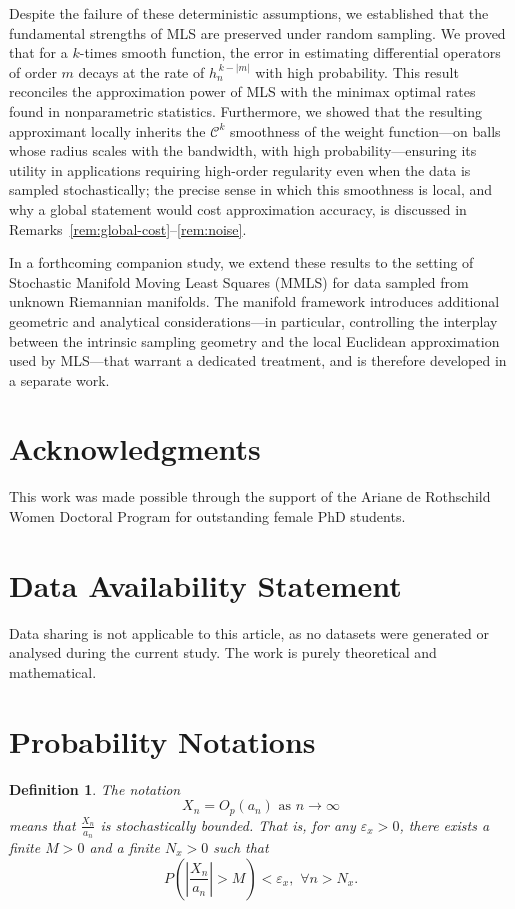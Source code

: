 \documentclass{article}
\newtheorem{definition}
{Definition}
\begin{document}
Despite the failure of these deterministic assumptions, we established that the
fundamental strengths of MLS are preserved under random sampling. We proved that
for a $k$-times smooth function, the error in estimating differential operators of
order $m$ decays at the rate of $h_n^{\,k-|m|}$ with
high probability. This result reconciles the approximation power of MLS with the
minimax optimal rates found in nonparametric statistics. Furthermore, we showed
that the resulting approximant locally inherits the $\mathcal{C}^k$ smoothness of the weight
function---on balls whose radius scales with the bandwidth, with high
probability---ensuring its utility in applications requiring high-order regularity
even when the data is sampled stochastically; the precise sense in which this
smoothness is local, and why a global statement would cost approximation accuracy,
is discussed in Remarks~\ref{rem:global-cost}--\ref{rem:noise}.

In a forthcoming companion study, we extend these results to the setting of
Stochastic Manifold Moving Least Squares (MMLS) for data sampled from unknown
Riemannian manifolds. The manifold framework introduces additional geometric and
analytical considerations---in particular, controlling the interplay between the
intrinsic sampling geometry and the local Euclidean approximation used by
MLS---that warrant a dedicated treatment, and is therefore developed in a separate
work.
\section*{Acknowledgments}

This work was made possible through the support of the Ariane de Rothschild Women Doctoral Program for outstanding female PhD students.

\section*{Data Availability Statement}
Data sharing is not applicable to this article, as no datasets were generated
or analysed during the current study. The work is purely theoretical and mathematical.

\appendix
\renewcommand{\thesection}{Appendix \Alph{section}:}
\section{Probability Notations}
\begin{definition}
    The notation 
    \begin{equation*}
        X_n=O_p\left(a_n\right) \text { as } n \rightarrow \infty
    \end{equation*}
        means that $\frac{X_n}{a_n}$ is stochastically  bounded. That is, for any ${\varepsilon_x} > 0$, there exists a finite $M > 0$ and a finite $N_x > 0$ such that
        \begin{equation*}
         P\left(\left|\frac{X_n}{a_n}\right|>M\right)<{\varepsilon_x},\,\, \forall n>N_x.
        \end{equation*}
        \label{def_of_O_p}
    \end{definition}
\end{document}
